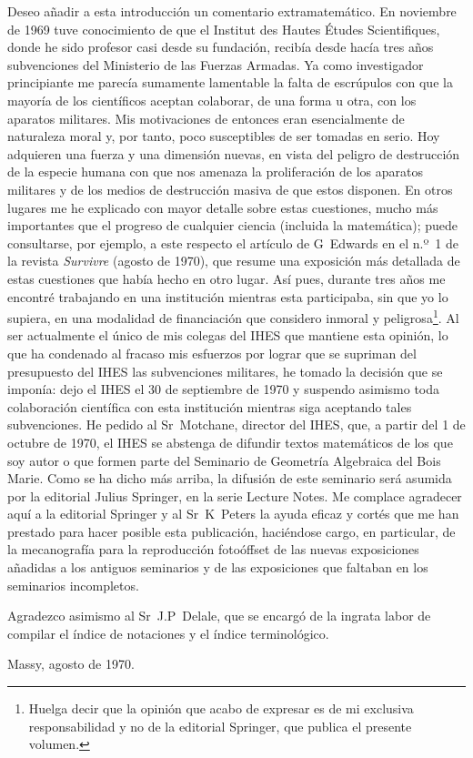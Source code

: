 Deseo añadir a esta introducción un comentario extramatemático. En noviembre de 1969 tuve conocimiento de que el Institut des Hautes Études Scientifiques, donde he sido profesor casi desde su fundación, recibía desde hacía tres años subvenciones del Ministerio de las Fuerzas Armadas. Ya como investigador principiante me parecía sumamente lamentable la falta de escrúpulos con que la mayoría de los científicos aceptan colaborar, de una forma u otra, con los aparatos militares. Mis motivaciones de entonces eran esencialmente de naturaleza moral y, por tanto, poco susceptibles de ser tomadas en serio. Hoy adquieren una fuerza y una dimensión nuevas, en vista del peligro de destrucción de la especie humana con que nos amenaza la proliferación de los aparatos militares y de los medios de destrucción masiva de que estos disponen. En otros lugares me he explicado con mayor detalle sobre estas cuestiones, mucho más importantes que el progreso de cualquier ciencia (incluida la matemática); puede consultarse, por ejemplo, a este respecto el artículo de G\ptbl\ Edwards en el n.º~1 de la revista \emph{Survivre} (agosto de 1970), que resume una exposición más detallada de estas cuestiones que había hecho en otro lugar. Así pues, durante tres años me encontré trabajando en una institución mientras esta participaba, sin que yo lo supiera, en una modalidad de financiación que considero inmoral y peligrosa\footnote{Huelga decir que la opinión que acabo de expresar es de mi exclusiva responsabilidad y no de la editorial Springer, que publica el presente volumen.}. Al ser actualmente el único de mis colegas del IHES que mantiene esta opinión, lo que ha condenado al fracaso mis esfuerzos por lograr que se supriman del presupuesto del IHES las subvenciones militares, he tomado la decisión que se imponía: dejo el IHES el 30 de septiembre de 1970 y suspendo asimismo toda colaboración científica con esta institución mientras siga aceptando tales subvenciones. He pedido al Sr\ptbl\ Motchane, director del IHES, que, a partir del 1 de octubre de 1970, el IHES se abstenga de difundir textos matemáticos de los que soy autor o que formen parte del Seminario de Geometría Algebraica del Bois Marie. Como se ha dicho más arriba, la difusión de este seminario será asumida por la editorial Julius Springer, en la serie Lecture Notes. Me complace agradecer aquí a la editorial Springer y al Sr\ptbl\ K\ptbl\ Peters la ayuda eficaz y cortés que me han prestado para hacer posible esta publicación, haciéndose cargo, en particular, de la mecanografía para la reproducción fotoóffset de las nuevas exposiciones añadidas a los antiguos seminarios y de las exposiciones que faltaban en los seminarios incompletos.

Agradezco asimismo al Sr\ptbl\ J.P\ptbl\ Delale, que se encargó de la ingrata labor de compilar el índice de notaciones y el índice terminológico.

\bigskip\hfill Massy, agosto de 1970.

